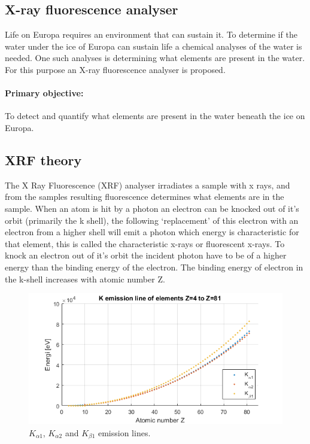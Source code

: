 \subsection{X-ray fluorescence analyser}
Life on Europa requires an environment that can sustain it. To determine if the water under the ice of Europa can sustain life a chemical analyses of the water is needed. One such analyses is determining what elements are present in the water. For this purpose an X-ray fluorescence analyser is proposed.

\paragraph{Primary objective:}
To detect and quantify what elements are present in the water beneath the ice on Europa.


\subsection{XRF theory}

The X Ray Fluorescence (XRF) analyser irradiates a sample with x rays, and from the samples resulting fluorescence determines what elements are in the sample. 
When an atom is hit by a photon an electron can be knocked out of it’s orbit (primarily  the k shell), the following ‘replacement’ of this electron with an electron from a higher shell  will emit a photon which energy is characteristic for that element, this is called the characteristic x-rays or fluorescent x-rays. To knock an electron out of it’s orbit the incident photon have to be of a higher energy than the binding energy of the electron. The binding energy of electron in the k-shell increases with atomic number Z. 

\begin{figure}[htb]
	\centering
	\includegraphics[width=\textwidth]{figures/XRF/Kalpha12Lines.png}
	\caption{$K_{\alpha 1}$, $K_{\alpha 2}$ and $K_{\beta 1}$ emission lines.}
	\label{fig:KalphaEmiLines}
\end{figure}

